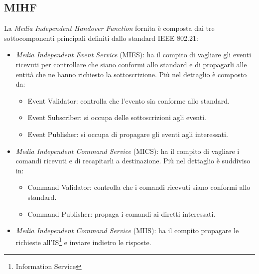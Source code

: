 \subsection{MIHF}
La {\em Media Independent Handover Function} fornita è composta dai tre sottocomponenti principali definiti dallo standard IEEE 802.21:
\begin{itemize}
\item {\em Media Independent Event Service} (MIES): ha il compito di vagliare gli eventi ricevuti per controllare che siano conformi allo standard e di propagarli alle entità che ne hanno richiesto la sottoscrizione. Più nel dettaglio è composto da:
\begin{itemize}
\item Event Validator: controlla che l'evento sia conforme allo standard.

\item Event Subscriber: si occupa delle sottoscrizioni agli eventi.

\item Event Publisher: si occupa di propagare gli eventi agli interessati.
\end{itemize}

\item {\em Media Independent Command Service} (MICS): ha il compito di vagliare i comandi ricevuti e di recapitarli a destinazione. Più nel dettaglio è suddiviso in:
\begin{itemize}
\item Command Validator: controlla che i comandi ricevuti siano conformi allo standard.

\item Command Publisher: propaga i comandi ai diretti interessati.
\end{itemize}

\item {\em Media Independent Command Service} (MIIS): ha il compito propagare le richieste all'IS\footnote{Information Service} e inviare indietro le risposte.
\end{itemize}

